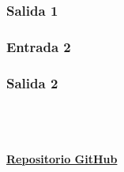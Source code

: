 \documentclass[https://www.overleaf.com/project/63761df255a8a9f4a15c3579
	letterpaper, %
	10pt, %
]{CSUniSchoolLabReport}
\begin{document}
\subsubsection*{Salida 1}

\subsubsection*{Entrada 2}

\subsubsection*{Salida 2}

\\
\\
\\
\href{https://github.com/DAOBLUR/CompilersPractices/tree/main/4}{\huge\faGithub \textbf{{Repositorio GitHub}} }
\end{document}
